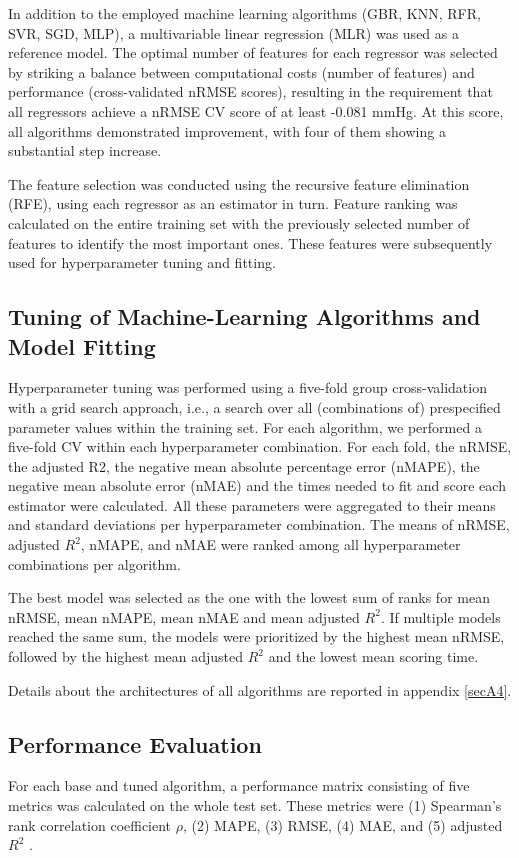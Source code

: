\documentclass[referee,lineno,pdflatex,sn-nature]{sn-jnl}%
\theoremstyle{thmstyleone}%
\theoremstyle{thmstyletwo}%
\theoremstyle{thmstylethree}%
\begin{document}
In addition to the employed machine learning algorithms (GBR, KNN, RFR, SVR, SGD, MLP), a multivariable linear regression (MLR) was used as a reference model. The optimal number of features for each regressor was selected by striking a balance between computational costs (number of features) and performance (cross-validated nRMSE scores), resulting in the requirement that all regressors achieve a nRMSE CV score of at least -0.081 mmHg. At this score, all algorithms demonstrated improvement, with four of them showing a substantial step increase. 

The feature selection was conducted using the recursive feature elimination (RFE), using each regressor as an estimator in turn. Feature ranking was calculated on the entire training set with the previously selected number of features to identify the most important ones. These features were subsequently used for hyperparameter tuning and fitting. 

\subsection{Tuning of Machine-Learning Algorithms and Model Fitting}\label{sec2.4}
Hyperparameter tuning was performed using a five-fold group cross-validation with a grid search approach, i.e., a search over all (combinations of) prespecified parameter values within the training set. For each algorithm, we performed a five-fold CV within each hyperparameter combination. For each fold, the nRMSE, the adjusted R2, the negative mean absolute percentage error (nMAPE), the negative mean absolute error (nMAE) and the times needed to fit and score each estimator were calculated. All these parameters were aggregated to their means and standard deviations per hyperparameter combination. The means of nRMSE, adjusted $R^2$, nMAPE, and nMAE were ranked among all hyperparameter combinations per algorithm.

The best model was selected as the one with the lowest sum of ranks for mean nRMSE, mean nMAPE, mean nMAE and mean adjusted $R^2$. If multiple models reached the same sum, the models were prioritized by the highest mean nRMSE, followed by the highest mean adjusted $R^2$ and the lowest mean scoring time. 

Details about the architectures of all algorithms are reported in appendix \ref{secA4}. 

\subsection{Performance Evaluation}\label{sec2.5}
For each base and tuned algorithm, a performance matrix consisting of five metrics was calculated on the whole test set. These metrics were (1) Spearman’s rank correlation coefficient $\rho$, (2) MAPE, (3) RMSE, (4) MAE, and (5) adjusted $R^2$ \cite{Sanz2015, Gadrey2019, Brown2016, Wu2020, Pedregosa2011}. 
\end{document}
